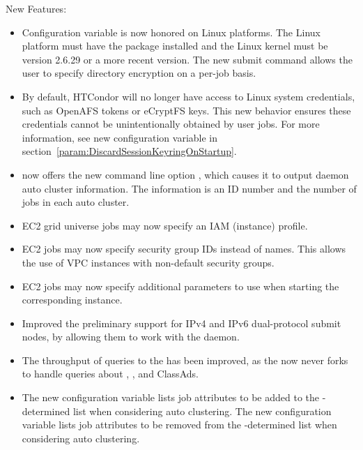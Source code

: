 \noindent New Features:

\begin{itemize}

\item Configuration variable  
is now honored on Linux platforms.
The Linux platform must have the   package installed
and the Linux kernel must be version 2.6.29 or a more recent version.
The new submit command  allows the user
to specify directory encryption on a per-job basis.


\item By default, HTCondor will no longer have access to Linux 
	system credentials, such as OpenAFS tokens or eCryptFS keys.
	This new behavior ensures these credentials cannot be
	unintentionally obtained by user jobs.  
	For more information, see new configuration variable 
	in section~\ref{param:DiscardSessionKeyringOnStartup}.

\item {} now offers the new command line option , 
which causes it to output  daemon auto cluster information. 
The information is an ID number and the number of jobs in each auto cluster.

\item EC2 grid universe jobs may now specify an IAM (instance) profile.

\item EC2 jobs may now specify security group IDs instead of names.
This allows the use of VPC instances with non-default security groups.

\item EC2 jobs may now specify additional parameters to use when starting
the corresponding instance.

\item Improved the preliminary support for IPv4 and IPv6 dual-protocol
submit nodes,
by allowing them to work with the  daemon.

\item The throughput of queries to the  has been
improved, as the  now never forks to handle queries 
about , , and 
ClassAds.

\item The new configuration variable 
lists job attributes to be added to the -determined list
when considering auto clustering.
The new configuration variable 
lists job attributes to be removed from the -determined 
list when considering auto clustering.


\end{itemize}
